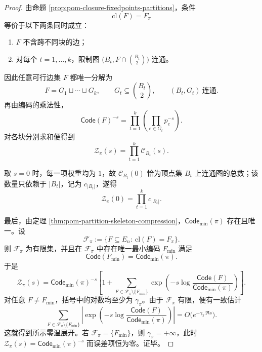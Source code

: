 \begin{proof}
由命题 \ref{prop:pom-closure-fixedpoints-partitions}，条件
\[
\mathrm{cl}(F)=F_\pi
\]
等价于以下两条同时成立：
\begin{enumerate}
  \item \(F\) 不含跨不同块的边；
  \item 对每个 \(t=1,\dots,k\)，限制图 \(\bigl(B_t,F\cap\binom{B_t}{2}\bigr)\) 连通。
\end{enumerate}
因此任意可行边集 \(F\) 都唯一分解为
\[
F=G_1\sqcup\cdots\sqcup G_k,
\qquad
G_t\subseteq \binom{B_t}{2},
\qquad
(B_t,G_t)\ \text{连通}.
\]
再由编码的乘法性，
\[
\mathsf{Code}(F)^{-s}
=
\prod_{t=1}^{k}
\left(\prod_{e\in G_t}p_e^{-s}\right).
\]
对各块分别求和便得到
\[
\mathcal Z_\pi(s)=\prod_{t=1}^{k}\mathcal C_{B_t}(s).
\]

取 \(s=0\) 时，每一项权重均为 \(1\)，故 \(\mathcal C_{B_t}(0)\) 恰为顶点集 \(B_t\) 上连通图的总数；该数量只依赖于 \(|B_t|\)，记为 \(c_{|B_t|}\)，遂得
\[
\mathcal Z_\pi(0)=\prod_{t=1}^{k}c_{|B_t|}.
\]

最后，由定理 \ref{thm:pom-partition-skeleton-compression}，\(\mathsf{Code}_{\min}(\pi)\) 存在且唯一。设
\[
\mathcal F_\pi:=\{F\subseteq E_n:\ \mathrm{cl}(F)=F_\pi\}.
\]
则 \(\mathcal F_\pi\) 为有限集，并且在 \(\mathcal F_\pi\) 中存在唯一最小编码 \(F_{\min}\) 满足
\[
\mathsf{Code}(F_{\min})=\mathsf{Code}_{\min}(\pi).
\]
于是
\[
\mathcal Z_\pi(s)
=
\mathsf{Code}_{\min}(\pi)^{-s}
\left[
1+
\sum_{F\in\mathcal F_\pi\setminus\{F_{\min}\}}
\exp\!\left(
-s\log\frac{\mathsf{Code}(F)}{\mathsf{Code}_{\min}(\pi)}
\right)
\right].
\]
对任意 \(F\neq F_{\min}\)，括号中的对数均至少为 \(\gamma_\pi\)。由于 \(\mathcal F_\pi\) 有限，便有一致估计
\[
\sum_{F\in\mathcal F_\pi\setminus\{F_{\min}\}}
\left|
\exp\!\left(
-s\log\frac{\mathsf{Code}(F)}{\mathsf{Code}_{\min}(\pi)}
\right)
\right|
=
O\!\bigl(e^{-\gamma_\pi\,\Re s}\bigr).
\]
这就得到所示零温展开。若 \(\mathcal F_\pi=\{F_{\min}\}\)，则 \(\gamma_\pi=+\infty\)，此时 \(\mathcal Z_\pi(s)=\mathsf{Code}_{\min}(\pi)^{-s}\) 而误差项恒为零。证毕。
\end{proof}

